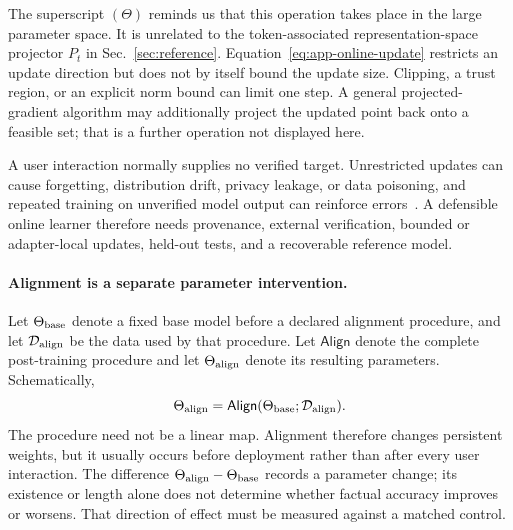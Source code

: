 \documentclass[
  aps,
  reprint,
  superscriptaddress,
  floatfix,
  nofootinbib,
  longbibliography
]{revtex4-2}
\begin{document}
The superscript $(\Theta)$ reminds us that this operation takes place in the
large parameter space.  It is unrelated to the token-associated
representation-space projector $P_t$ in
Sec.~\ref{sec:reference}.  Equation~\eqref{eq:app-online-update} restricts an
update direction but does not by itself bound the update size.  Clipping, a
trust region, or an explicit norm bound can limit one step.  A general
projected-gradient algorithm may additionally project the updated point back
onto a feasible set; that is a further operation not displayed here.

A user interaction normally supplies no verified target.  Unrestricted
updates can cause forgetting, distribution drift, privacy leakage, or data
poisoning, and repeated training on unverified model output can reinforce
errors~\cite{herel2024collapse}.  A defensible online learner therefore needs
provenance, external verification, bounded or adapter-local updates, held-out
tests, and a recoverable reference model.

\paragraph{Alignment is a separate parameter intervention.}
Let $\Theta_{\rm base}$ denote a fixed base model before a declared alignment
procedure, and let $\mathcal D_{\rm align}$ be the data used by that procedure.
Let $\mathsf{Align}$ denote the complete post-training procedure and let
$\Theta_{\rm align}$ denote its resulting parameters.  Schematically,
\begin{equation}
\label{eq:app-alignment-map}
\Theta_{\rm align}
=\mathsf{Align}(\Theta_{\rm base};\mathcal D_{\rm align}).
\end{equation}
The procedure need not be a linear map.  Alignment therefore changes persistent weights, but
it usually occurs before deployment rather than after every user interaction.
The difference $\Theta_{\rm align}-\Theta_{\rm base}$ records a parameter
change; its existence or length alone does not determine whether factual
accuracy improves or worsens.  That direction of effect must be measured
against a matched control.
\end{document}
